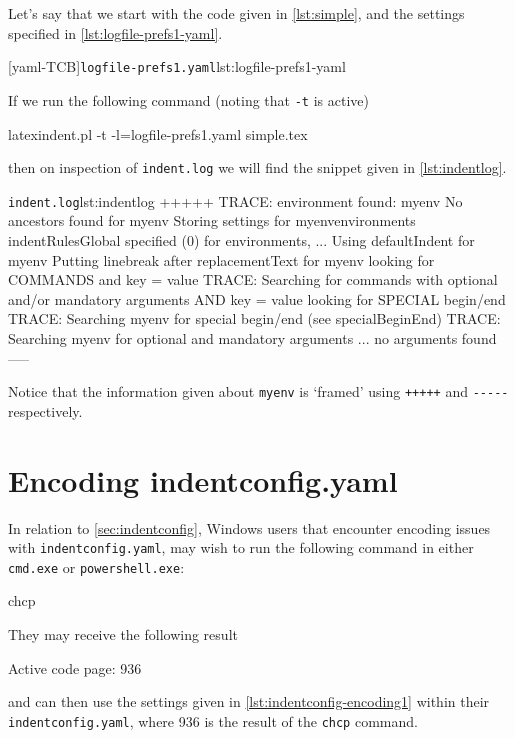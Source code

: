   \begin{example}
  Let's say that we start with the code given in \cref{lst:simple}, and the settings
  specified in \cref{lst:logfile-prefs1-yaml}.

  \begin{minipage}{.35\linewidth}
  \end{minipage}
  \hfill
  \begin{minipage}{.6\linewidth}
   [yaml-TCB]{\texttt{logfile-prefs1.yaml}}{lst:logfile-prefs1-yaml}
  \end{minipage}

  If we run the following command (noting that \texttt{-t} is active)

  \begin{commandshell}
latexindent.pl -t -l=logfile-prefs1.yaml simple.tex 
\end{commandshell}

  then on inspection of \texttt{indent.log} we will find the snippet given in
  \cref{lst:indentlog}.
  \begin{cmhlistings}[style=tcblatex,morekeywords={TRACE}]{\texttt{indent.log}}{lst:indentlog}
       +++++
TRACE: environment found: myenv
       No ancestors found for myenv
       Storing settings for myenvenvironments
       indentRulesGlobal specified (0) for environments, ...
       Using defaultIndent for myenv
       Putting linebreak after replacementText for myenv
       looking for COMMANDS and key = {value}
TRACE: Searching for commands with optional and/or mandatory arguments AND key = {value}
       looking for SPECIAL begin/end
TRACE: Searching myenv for special begin/end (see specialBeginEnd)
TRACE: Searching myenv for optional and mandatory arguments
       ... no arguments found
       -----
     \end{cmhlistings}
  Notice that the information given about \texttt{myenv} is `framed' using \texttt{+++++}
  and \lstinline!-----! respectively.
  \end{example}

 \section{Encoding indentconfig.yaml}\label{app:encoding}
  In relation to \vref{sec:indentconfig}, Windows users that encounter encoding issues
  with \texttt{indentconfig.yaml}, may wish to run the following command in either
  \texttt{cmd.exe} or \texttt{powershell.exe}:
  \begin{dosprompt}
chcp
    \end{dosprompt}
  They may receive the following result
  \begin{dosprompt}
Active code page: 936
    \end{dosprompt}
  and can then use the settings given in \cref{lst:indentconfig-encoding1} within their
  \texttt{indentconfig.yaml}, where 936 is the result of the \texttt{chcp} command.


